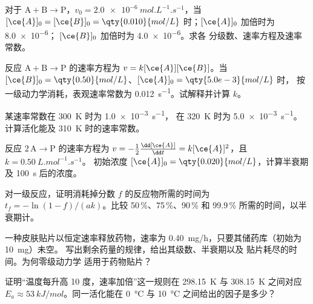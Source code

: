 \begin{exercise}[$\star\star$]\label{exo:b1:rate-laws:6}
对于 $\mathrm{A} + \mathrm{B} \longrightarrow \mathrm{P}$，$v_0 = \qty{2.0e-6}{mol.L^{-1}.s^{-1}}$，当 $[\ce{A}]_0
= [\ce{B}]_0 = \qty{0.010}{mol/L}$ 时；$[\ce{A}]_0$ 加倍时为 \qty{8.0e-6}{}；
$[\ce{B}]_0$ 加倍时为 \qty{4.0e-6}{}。求各
分级数、速率方程及速率常数。
\end{exercise}

\begin{exercise}[$\star\star$]\label{exo:b1:rate-laws:7}
反应 $\mathrm{A} + \mathrm{B} \longrightarrow \mathrm{P}$ 的速率方程为 $v = k[\ce{A}][\ce{B}]$。当
$[\ce{B}]_0 = \qty{0.50}{mol/L}$、$[\ce{A}]_0 = \qty{5.0e-3}{mol/L}$ 时，
 按一级动力学消耗，表观速率常数为
\qty{0.012}{s^{-1}}。试解释并计算 $k$。
\end{exercise}

\begin{exercise}[$\star\star$]\label{exo:b1:rate-laws:8}
某速率常数在 \qty{300}{K} 时为 \qty{1.0e-3}{s^{-1}}，
在 \qty{320}{K} 时为 \qty{5.0e-3}{s^{-1}}。计算活化能及
\qty{310}{K} 时的速率常数。
\end{exercise}

\begin{exercise}[$\star\star$]\label{exo:b1:rate-laws:9}
反应 $2\,\mathrm{A} \longrightarrow \mathrm{P}$ 的速率方程为 $v = -\frac12\frac{\dd[\ce{A}]}
{\dd t} = k[\ce{A}]^2$，且 $k = \qty{0.50}{L.mol^{-1}.s^{-1}}$。
初始浓度 $[\ce{A}]_0 = \qty{0.020}{mol/L}$，计算半衰期及
\qty{100}{s} 后的浓度。
\end{exercise}

\begin{exercise}[$\star\star\star$]\label{exo:b1:rate-laws:10}
对一级反应，证明消耗掉分数
$f$ 的反应物所需的时间为 $t_f = -\ln(1 - f)/(ak)$。比较
50\,\%、75\,\%、90\,\% 和 99.9\,\% 所需的时间，以半衰期计。
\end{exercise}

\begin{exercise}[$\star\star\star$]\label{exo:b1:rate-laws:11}
一种皮肤贴片以恒定速率释放药物，速率为
\qty{0.40}{mg/h}，只要其储药库（初始为 \qty{10}{mg}）未空。
写出剩余药量的规律，给出其级数、半衰期以及
贴片耗尽的时间。为何零级动力学
适用于药物贴片？
\end{exercise}

\begin{exercise}[$\star\star\star$]\label{exo:b1:rate-laws:12}
证明“温度每升高 10 度，速率加倍”这一规则在
\qty{298.15}{K} 与 \qty{308.15}{K} 之间对应 $E_a \approx
\qty{53}{kJ/mol}$。同一活化能在
\qty{0}{\celsius} 与 \qty{10}{\celsius} 之间给出的因子是多少？
\end{exercise}

